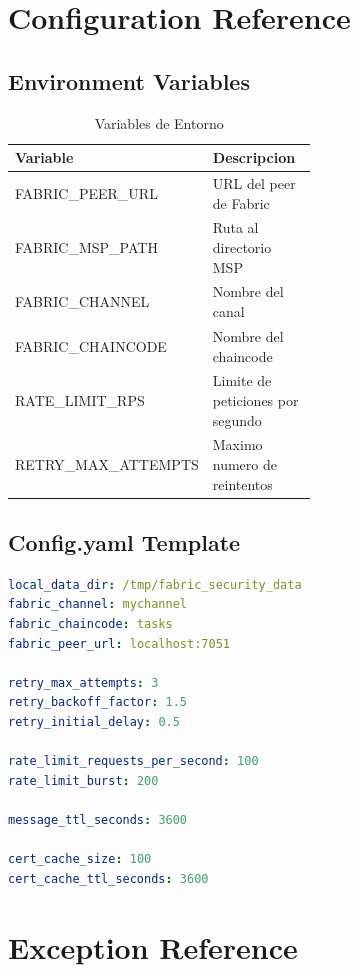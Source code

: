 \documentclass[12pt,a4paper]{report}
\begin{document}
\begin{appendices}

\chapter{Configuration Reference}
\cleardoublepage

\section{Environment Variables}

\begin{table}[H]
    \centering
    \begin{tabular}{lp{0.6\linewidth}}
        \toprule
        \textbf{Variable} & \textbf{Descripcion} \\
        \midrule
        FABRIC\_PEER\_URL & URL del peer de Fabric \\
        FABRIC\_MSP\_PATH & Ruta al directorio MSP \\
        FABRIC\_CHANNEL & Nombre del canal \\
        FABRIC\_CHAINCODE & Nombre del chaincode \\
        RATE\_LIMIT\_RPS & Limite de peticiones por segundo \\
        RETRY\_MAX\_ATTEMPTS & Maximo numero de reintentos \\
        \bottomrule
    \end{tabular}
    \caption{Variables de Entorno}
\end{table}

\section{Config.yaml Template}

\begin{lstlisting}[language=yaml, caption={config.yaml}]
local_data_dir: /tmp/fabric_security_data
fabric_channel: mychannel
fabric_chaincode: tasks
fabric_peer_url: localhost:7051

retry_max_attempts: 3
retry_backoff_factor: 1.5
retry_initial_delay: 0.5

rate_limit_requests_per_second: 100
rate_limit_burst: 200

message_ttl_seconds: 3600

cert_cache_size: 100
cert_cache_ttl_seconds: 3600
\end{lstlisting}

\chapter{Exception Reference}
\cleardoublepage


\end{appendices}
\end{document}
